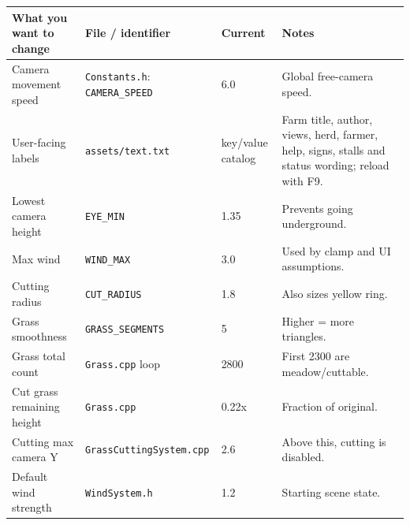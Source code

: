 \documentclass[11pt,a4paper,openany]{book}
\newcommand{\code}[1]{\texttt{#1}}
\newcommand{\file}[1]{\nolinkurl{#1}}
\begin{document}
\begin{longtable}{@{}p{}p{}p{}p{}@{}}
	\toprule
	What you want to change    & File / identifier                       & Current           & Notes                                                                                    \\
	\midrule
	\endhead
	Camera movement speed      & \file{Constants.h}: \code{CAMERA_SPEED} & 6.0               & Global free-camera speed.                                                                \\
	User-facing labels         & \file{assets/text.txt}                  & key/value catalog & Farm title, author, views, herd, farmer, help, signs, stalls and status wording; reload with F9. \\
	Lowest camera height       & \code{EYE_MIN}                          & 1.35              & Prevents going underground.                                                              \\
	Max wind                   & \code{WIND_MAX}                         & 3.0               & Used by clamp and UI assumptions.                                                        \\
	Cutting radius             & \code{CUT_RADIUS}                       & 1.8               & Also sizes yellow ring.                                                                  \\
	Grass smoothness           & \code{GRASS_SEGMENTS}                   & 5                 & Higher = more triangles.                                                                 \\
	Grass total count          & \file{Grass.cpp} loop                   & 2800              & First 2300 are meadow/cuttable.                                                          \\
	Cut grass remaining height & \file{Grass.cpp}                        & 0.22x             & Fraction of original.                                                                    \\
	Cutting max camera Y       & \file{GrassCuttingSystem.cpp}           & 2.6               & Above this, cutting is disabled.                                                         \\
	Default wind strength      & \file{WindSystem.h}                     & 1.2               & Starting scene state.                                                                    \\

\end{longtable}
\end{document}
